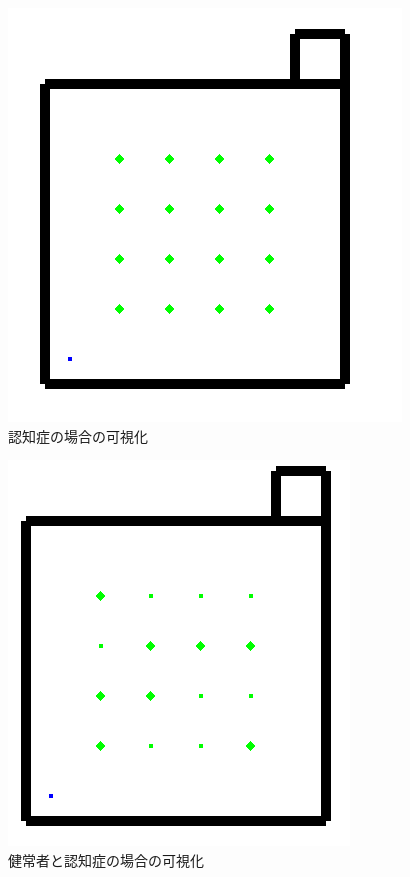 \begin{figure}[htb]
\begin{center}
 \includegraphics[scale=0.6]{figures/elderly_v3.png}
 \caption[認知症の場合の可視化]{認知症の場合の可視化 \label{elderly_v3}}
\end{center}
\end{figure}

\begin{figure}[htb]
\begin{center}
 \includegraphics[scale=0.6]{figures/health_urinate.png}
 \caption[健常者と認知症の場合の可視化]{健常者と認知症の場合の可視化 \label{health_urinate}}
\end{center}
\end{figure}

